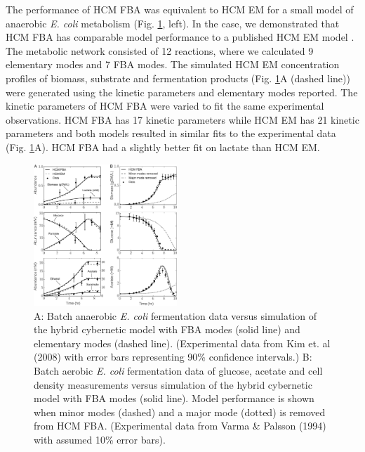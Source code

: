 \documentclass[10pt,twocolumn,twoside,final]{IEEEtran}
\begin{document}
The performance of HCM FBA was equivalent to HCM EM for a small model of anaerobic \textit{E. coli} metabolism (Fig. \ref{fig:ecoli}, left).
In the case, we demonstrated that HCM FBA has comparable model performance to a published HCM EM model \cite{2008_kim_varner_ramkrishna_BiotechProg}.
The metabolic network consisted of 12 reactions, where we calculated 9 elementary modes and 7 FBA modes.
The simulated HCM EM concentration profiles of biomass, substrate and fermentation products (Fig. \ref {fig:ecoli}A (dashed line)) were generated using the kinetic parameters and elementary modes reported\cite{2008_kim_varner_ramkrishna_BiotechProg}.
The kinetic parameters of HCM FBA were varied to fit the same experimental observations.
HCM FBA has 17 kinetic parameters while HCM EM has 21 kinetic parameters and both models resulted in similar fits to the experimental data (Fig. \ref {fig:ecoli}A).
HCM FBA had a slightly better fit on lactate than HCM EM.

\begin{figure}[!t]\centering
\includegraphics[width=0.48\textwidth]{./figs/Fig-2-Ecoli-SimulationResults.pdf}
\caption{A: Batch anaerobic \textit{E. coli} fermentation data versus simulation of the hybrid cybernetic model with FBA modes (solid line) and elementary modes (dashed line). (Experimental data from Kim et. al (2008)\cite{2008_kim_varner_ramkrishna_BiotechProg} with error bars representing 90\% confidence intervals.) B: Batch aerobic \textit{E. coli} fermentation data of glucose, acetate and cell density measurements versus simulation of the hybrid cybernetic model with FBA modes (solid line). Model performance is shown when minor modes (dashed) and a major mode (dotted) is removed from HCM FBA. (Experimental data from Varma \& Palsson (1994)\cite{1994_varma_palsson_ApplEnvMicro} with assumed 10\% error bars).}
\label{fig:ecoli}
\end{figure}
\end{document}
